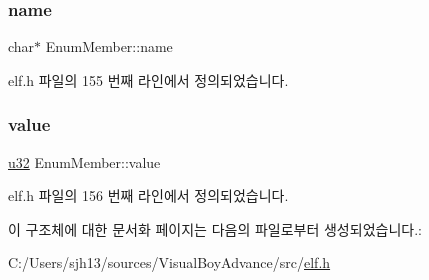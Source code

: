 \subsubsection{\texorpdfstring{name}{name}}
{\footnotesize\ttfamily char$\ast$ Enum\+Member\+::name}



elf.\+h 파일의 155 번째 라인에서 정의되었습니다.

\mbox{\label{struct_enum_member_a087360a6d98032f07a743435e3c19b43}} 
\subsubsection{\texorpdfstring{value}{value}}
{\footnotesize\ttfamily \mbox{\hyperlink{_system_8h_a10e94b422ef0c20dcdec20d31a1f5049}{u32}} Enum\+Member\+::value}



elf.\+h 파일의 156 번째 라인에서 정의되었습니다.



이 구조체에 대한 문서화 페이지는 다음의 파일로부터 생성되었습니다.\+:\begin{DoxyCompactItemize}
\item 
C\+:/\+Users/sjh13/sources/\+Visual\+Boy\+Advance/src/\mbox{\hyperlink{elf_8h}{elf.\+h}}\end{DoxyCompactItemize}
